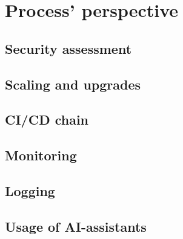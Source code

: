 \section{Process' perspective}
\subsection{Security assessment}


\subsection{Scaling and upgrades}


\subsection{CI/CD chain}\label{cicd}


\subsection{Monitoring}


\subsection{Logging}


\subsection{Usage of AI-assistants}
